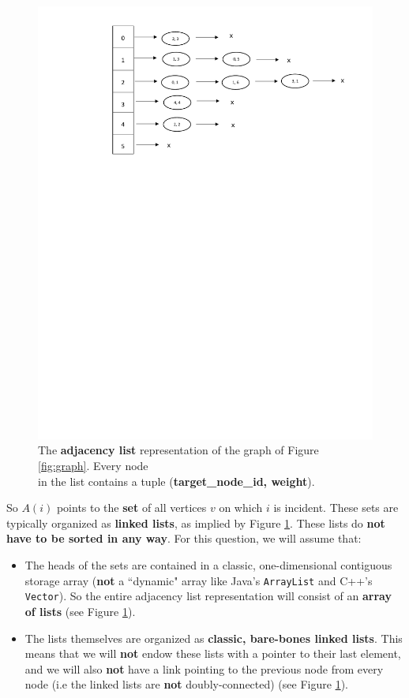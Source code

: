 \documentclass[letterpaper,12pt]{article}
\begin{document}
\begin{figure}[H]
		\centering
		\includegraphics[scale=.8]{img/adjList}
	\caption{The {\bf adjacency list} representation of the graph of Figure \ref{fig:graph}. Every node \\ in the list contains a tuple (\textbf{target\_node\_id, weight}).}
	\label{fig:adjList}
\end{figure}

So $A(i)$ points to the \textbf{set} of all vertices $v$ on which $i$ is incident. These sets are typically organized as \textbf{linked lists}, as implied by Figure \ref{fig:adjList}. These lists do \textbf{not have to be sorted in any way}. For this question, we will assume that:

	\begin{itemize}
		\item The heads of the sets are contained in a classic, one-dimensional contiguous storage array ({\bf not} a ``dynamic" array like Java's {\tt ArrayList} and C++'s {\tt Vector}). So the entire adjacency list representation will consist of an \textbf{array of lists} (see Figure \ref{fig:adjList}).
		\item The lists themselves are organized as {\bf classic, bare-bones linked lists}. This means that we will {\bf not} endow these lists with a pointer to their last element, and we will also {\bf not} have a link pointing to the previous node from every node (i.e the linked lists are {\bf not} doubly-connected) (see Figure \ref{fig:adjList}).
	\end{itemize} 
	
\end{document}
